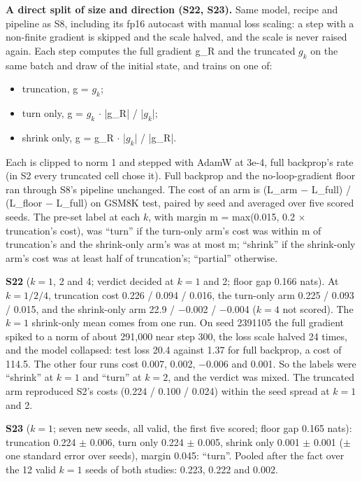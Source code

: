 \documentclass[10pt]{article}
\begin{document}
\textbf{A direct split of size and direction (S22, S23).} Same model, recipe and pipeline as S8, including its fp16 autocast with manual loss scaling: a step with a non-finite gradient is skipped and the scale halved, and the scale is never raised again. Each step computes the full gradient g\_R and the truncated $g_k$ on the same batch and draw of the initial state, and trains on one of:

\begin{itemize}
\item truncation, g = $g_k$;
\item turn only, g = $g_k$ $\cdot$ |g\_R| / |$g_k$|;
\item shrink only, g = g\_R $\cdot$ |$g_k$| / |g\_R|.
\end{itemize}

Each is clipped to norm 1 and stepped with AdamW at 3e-4, full backprop's rate (in S2 every truncated cell chose it). Full backprop and the no-loop-gradient floor ran through S8's pipeline unchanged. The cost of an arm is (L\_arm $-$ L\_full) / (L\_floor $-$ L\_full) on GSM8K test, paired by seed and averaged over five scored seeds. The pre-set label at each $k$, with margin m = max(0.015, 0.2 $\times$ truncation's cost), was ``turn'' if the turn-only arm's cost was within m of truncation's and the shrink-only arm's was at most m; ``shrink'' if the shrink-only arm's cost was at least half of truncation's; ``partial'' otherwise.

\textbf{S22} ($k = 1$, 2 and 4; verdict decided at $k = 1$ and 2; floor gap 0.166 nats). At $k = 1 / 2 / 4$, truncation cost 0.226 / 0.094 / 0.016, the turn-only arm 0.225 / 0.093 / 0.015, and the shrink-only arm 22.9 / $-$0.002 / $-$0.004 ($k = 4$ not scored). The $k = 1$ shrink-only mean comes from one run. On seed 2391105 the full gradient spiked to a norm of about 291,000 near step 300, the loss scale halved 24 times, and the model collapsed: test loss 20.4 against 1.37 for full backprop, a cost of 114.5. The other four runs cost 0.007, 0.002, $-$0.006 and 0.001. So the labels were ``shrink'' at $k = 1$ and ``turn'' at $k = 2$, and the verdict was mixed. The truncated arm reproduced S2's costs (0.224 / 0.100 / 0.024) within the seed spread at $k = 1$ and 2.

\textbf{S23} ($k = 1$; seven new seeds, all valid, the first five scored; floor gap 0.165 nats): truncation 0.224 $\pm$ 0.006, turn only 0.224 $\pm$ 0.005, shrink only 0.001 $\pm$ 0.001 ($\pm$ one standard error over seeds), margin 0.045: ``turn''. Pooled after the fact over the 12 valid $k = 1$ seeds of both studies: 0.223, 0.222 and 0.002.
\end{document}
